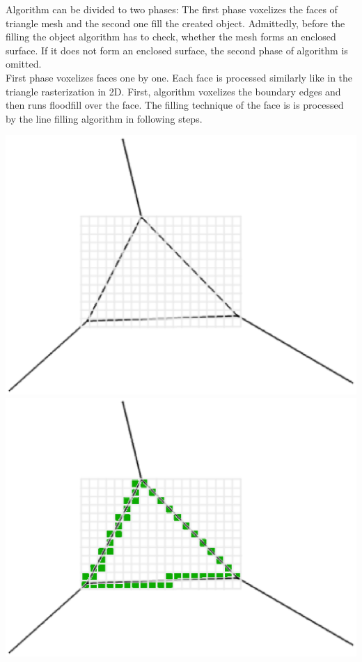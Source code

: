 Algorithm can be divided to two phases: The first phase voxelizes the faces of triangle mesh and the
second one fill the created object. Admittedly, before the filling the object algorithm has to check,
whether the mesh forms an enclosed surface. If it does not form an enclosed surface, the second phase of
algorithm is omitted.\\

First phase voxelizes faces one by one. Each face is processed similarly like in the triangle 
rasterization in 2D.
First, algorithm voxelizes the boundary edges and then runs floodfill over the face. The filling
technique of the face is is processed by the line filling algorithm in following steps. 

\includegraphics[scale=0.2]{../img/voxelize_1.eps}
\includegraphics[scale=0.2]{../img/voxelize_2.eps}
